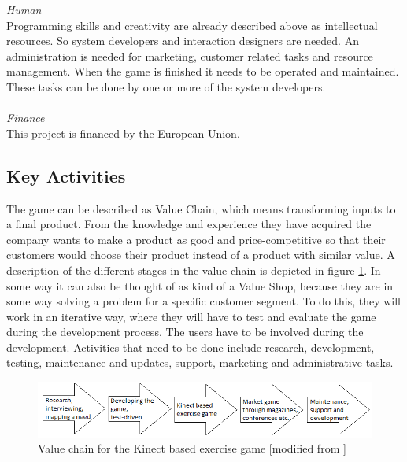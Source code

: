 \emph{Human} \\ Programming skills and creativity are already described above as intellectual resources. So system developers and interaction designers are needed. An administration is needed for marketing, customer related tasks and resource management. When the game is finished it needs to be operated and maintained. These tasks can be done by one or more of the system developers. \\ \\
\emph{Finance} \\ This project is financed by the European Union. 
\subsection{Key Activities}
The game can be described as Value Chain, which means transforming inputs to a final product. From the knowledge and experience they have acquired the company wants to make a product as good and price-competitive so that their customers would choose their product instead of a product with similar value. A description of the different stages in the value chain is depicted in figure \ref{fig:ValueChainCase}. In some way it can also be thought of as kind of a Value Shop, because they are in some way solving a problem for a specific customer segment. To do this, they will work in an iterative way, where they will have to test and evaluate the game during the development process. The users have to be involved during the development. 
Activities that need to be done include research, development, testing, maintenance and updates, support, marketing and administrative tasks. 
\begin{figure}[h]
\caption[Value Chain for the Kinect Based Exercise Game]{Value chain for the Kinect based exercise game [modified from \cite{osterwalderthesis}]}
\label{fig:ValueChainCase}
\begin{center}
\includegraphics[scale=0.7]{valuechaincase}
\end{center}
\end{figure}
